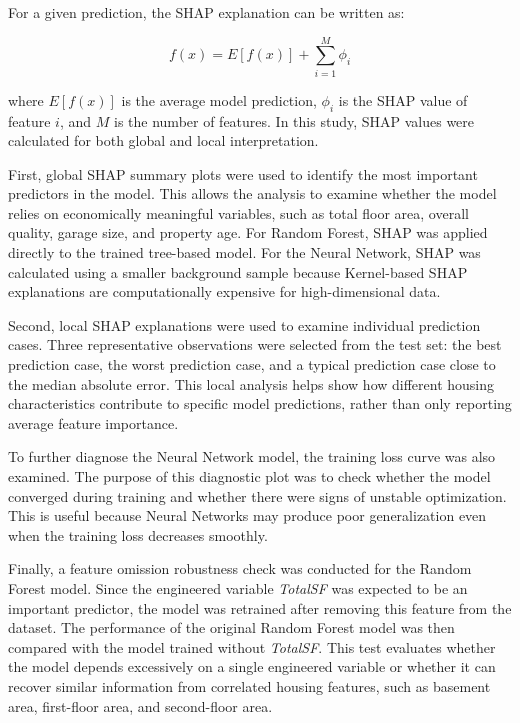 \documentclass[12pt,a4paper,oneside,openany]{book}
\begin{document}
For a given prediction, the SHAP explanation can be written as:

\begin{equation}
f(x) = E[f(x)] + \sum_{i=1}^{M} \phi_i
\end{equation}

where $E[f(x)]$ is the average model prediction, $\phi_i$ is the SHAP value of feature $i$, and $M$ is the number of features. In this study, SHAP values were calculated for both global and local interpretation.

First, global SHAP summary plots were used to identify the most important predictors in the model. This allows the analysis to examine whether the model relies on economically meaningful variables, such as total floor area, overall quality, garage size, and property age. For Random Forest, SHAP was applied directly to the trained tree-based model. For the Neural Network, SHAP was calculated using a smaller background sample because Kernel-based SHAP explanations are computationally expensive for high-dimensional data.

Second, local SHAP explanations were used to examine individual prediction cases. Three representative observations were selected from the test set: the best prediction case, the worst prediction case, and a typical prediction case close to the median absolute error. This local analysis helps show how different housing characteristics contribute to specific model predictions, rather than only reporting average feature importance.

To further diagnose the Neural Network model, the training loss curve was also examined. The purpose of this diagnostic plot was to check whether the model converged during training and whether there were signs of unstable optimization. This is useful because Neural Networks may produce poor generalization even when the training loss decreases smoothly.

Finally, a feature omission robustness check was conducted for the Random Forest model. Since the engineered variable \textit{TotalSF} was expected to be an important predictor, the model was retrained after removing this feature from the dataset. The performance of the original Random Forest model was then compared with the model trained without \textit{TotalSF}. This test evaluates whether the model depends excessively on a single engineered variable or whether it can recover similar information from correlated housing features, such as basement area, first-floor area, and second-floor area.
\end{document}
